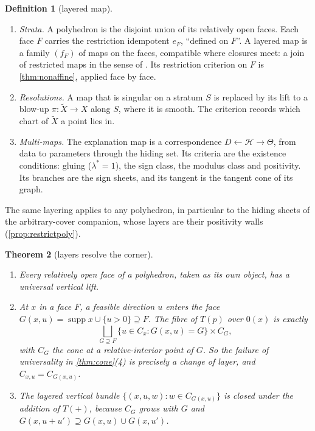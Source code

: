 \documentclass[11pt]{article}
\newtheorem{theorem}{Theorem}\newtheorem{proposition}[theorem]{Proposition}\newtheorem{lemma}[theorem]{Lemma}\newtheorem{corollary}[theorem]{Corollary}
\theoremstyle{definition}\newtheorem{definition}[theorem]{Definition}\newtheorem{remark}[theorem]{Remark}\newtheorem{example}[theorem]{Example}
\begin{document}
\begin{definition}[layered map]\label{def:layered}
\begin{enumerate}
\item[(1)] \emph{Strata.} A polyhedron is the disjoint union of its relatively open faces. Each face $F$ carries the restriction
  idempotent $e_F$, ``defined on $F$''. A layered map is a family $(f_F)$ of maps on the faces, compatible where closures meet: a join of
  restricted maps in the sense of \cite{CockettCruttwellGallagher2011}. Its restriction criterion on $F$ is \cref{thm:nonaffine},
  applied face by face.
\item[(2)] \emph{Resolutions.} A map that is singular on a stratum $S$ is replaced by its lift to a blow-up $\pi:\tilde X\to X$ along $S$,
  where it is smooth. The criterion records which chart of $\tilde X$ a point lies in.
\item[(3)] \emph{Multi-maps.} The explanation map is a correspondence $D\leftarrow\mathcal H\rightarrow\Theta$, from data to
  parameters through the hiding set. Its criteria are the existence conditions: gluing ($\lambda^*=1$), the sign class, the modulus class
  and positivity. Its branches are the sign sheets, and its tangent is the tangent cone of its graph.
\end{enumerate}
\end{definition}

The same layering applies to any polyhedron, in particular to the hiding sheets of the arbitrary-cover companion, whose layers are their
positivity walls (\cref{prop:restrictpoly}).

\begin{theorem}[layers resolve the corner]\label{thm:layers}
\begin{enumerate}
\item[(1)] Every relatively open face of a polyhedron, taken as its own object, has a universal vertical lift.
\item[(2)] At $x$ in a face $F$, a feasible direction $u$ enters the face $G(x,u)=\operatorname{supp}x\cup\{u>0\}\supseteq F$. The fibre
  of $T(p)$ over $0(x)$ is exactly
\[
\bigsqcup_{G\supseteq F}\{u\in C_x:G(x,u)=G\}\times C_G ,
\]
  with $C_G$ the cone at a relative-interior point of $G$. So the failure of universality in \cref{thm:cone}(4) is precisely a change
  of layer, and $C_{x,u}=C_{G(x,u)}$.
\item[(3)] The layered vertical bundle $\{(x,u,w):w\in C_{G(x,u)}\}$ is closed under the addition of $T(+)$, because $C_G$ grows with
  $G$ and $G(x,u+u')\supseteq G(x,u)\cup G(x,u')$.
\end{enumerate}
\end{theorem}
\end{document}
